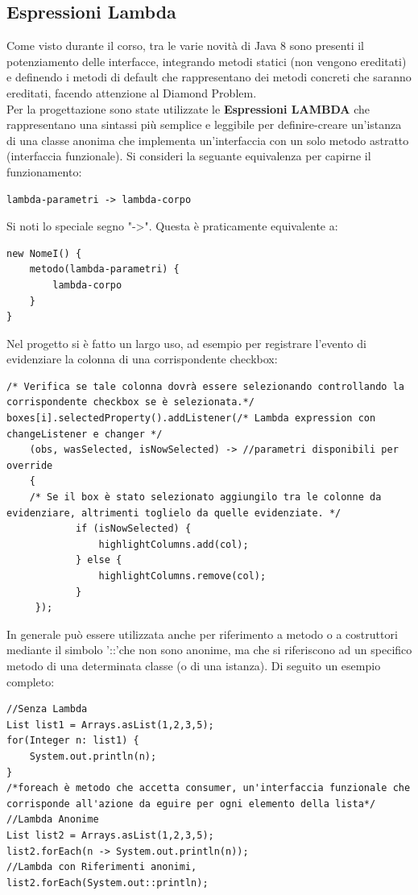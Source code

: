 \documentclass[a4paper, oneside]{book}
\begin{document}
\subsection*{Espressioni Lambda}
Come visto durante il corso, tra le varie novità di Java 8 sono presenti il potenziamento delle interfacce, integrando metodi statici (non vengono ereditati) e definendo i metodi di default che rappresentano dei metodi concreti che saranno ereditati, facendo attenzione al Diamond Problem.\\
Per la progettazione sono state utilizzate le \textbf{Espressioni LAMBDA} che rappresentano una sintassi più semplice e leggibile per definire-creare un'istanza di una classe anonima che implementa un'interfaccia con un solo metodo astratto (interfaccia funzionale). Si consideri la seguante equivalenza per capirne il funzionamento:\\

\begin{lstlisting}
lambda-parametri -> lambda-corpo
\end{lstlisting}

Si noti lo speciale segno "->". Questa è praticamente equivalente a:
\begin{lstlisting}
new NomeI() {
    metodo(lambda-parametri) {
        lambda-corpo
    }
}
\end{lstlisting}
Nel progetto si è fatto un largo uso, ad esempio per registrare l'evento di evidenziare la colonna di una corrispondente checkbox:
\begin{lstlisting}
/* Verifica se tale colonna dovrà essere selezionando controllando la corrispondente checkbox se è selezionata.*/
boxes[i].selectedProperty().addListener(/* Lambda expression con changeListener e changer */
	(obs, wasSelected, isNowSelected) -> //parametri disponibili per override
	{
	/* Se il box è stato selezionato aggiungilo tra le colonne da evidenziare, altrimenti toglielo da quelle evidenziate. */
            if (isNowSelected) {
                highlightColumns.add(col);
            } else {
                highlightColumns.remove(col);
            }
     });
\end{lstlisting}
In generale può essere utilizzata anche per riferimento a metodo o a costruttori mediante il simbolo '::'che non sono anonime, ma che si riferiscono ad un specifico metodo di una determinata classe (o di una istanza). Di seguito un esempio completo:
\begin{lstlisting}
//Senza Lambda
List list1 = Arrays.asList(1,2,3,5);
for(Integer n: list1) {
    System.out.println(n);
}
/*foreach è metodo che accetta consumer, un'interfaccia funzionale che corrisponde all'azione da eguire per ogni elemento della lista*/
//Lambda Anonime 
List list2 = Arrays.asList(1,2,3,5);
list2.forEach(n -> System.out.println(n)); 
//Lambda con Riferimenti anonimi, 
list2.forEach(System.out::println);
\end{lstlisting}
\end{document}
